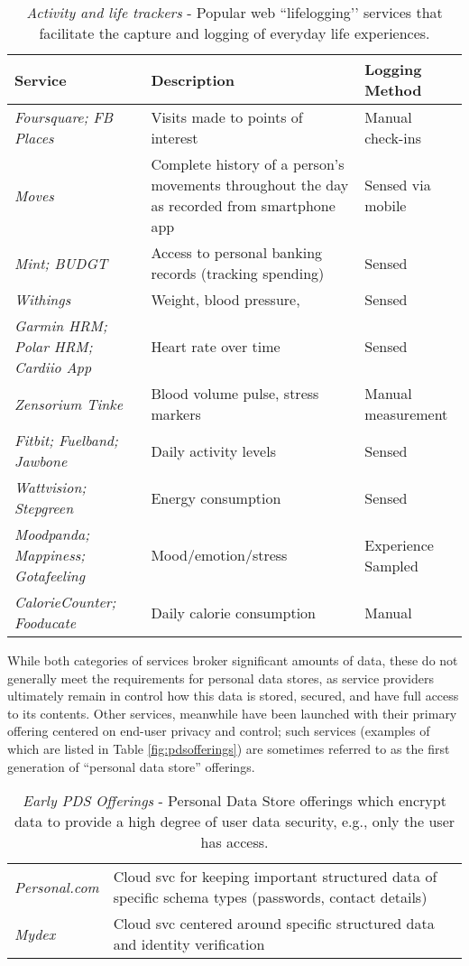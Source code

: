 \documentclass[graybox]{svmult}
\begin{document}
\begin{table}
\begin{tabular}{p{3cm} p{4.5cm} p{2.54cm}}
Service & Description & Logging Method \\
\hline
\emph{Foursquare; FB Places} & Visits made to points of interest & Manual check-ins \\
\emph{Moves} & Complete history of a person's movements throughout the day as recorded from smartphone app  & Sensed via mobile \\ 
\emph{Mint; BUDGT} & Access to personal banking records (tracking spending) & Sensed\\
\emph{Withings} & Weight, blood pressure,& Sensed \\
\emph{Garmin HRM; Polar HRM; Cardiio App} & Heart rate over time & Sensed \\
\emph{Zensorium Tinke} & Blood volume pulse, stress markers & Manual measurement \\
\emph{Fitbit; Fuelband; Jawbone} & Daily activity levels & Sensed \\ 
\emph{Wattvision; Stepgreen} & Energy consumption & Sensed \\
\emph{Moodpanda; Mappiness; Gotafeeling} & Mood/emotion/stress & Experience Sampled \\
\emph{CalorieCounter; Fooducate} & Daily calorie consumption & Manual \\
\end{tabular}
\caption{\emph{Activity and life trackers} - Popular web ``lifelogging’’ services that facilitate the capture and logging of everyday life experiences. }
\label{fig:aboutme}
\end{table}

While both categories of services broker significant amounts of data, these do not generally meet the requirements for personal data stores, as service providers ultimately remain in control how this data is stored, secured, and have full access to its contents.  Other services, meanwhile have been launched with their primary offering centered on end-user privacy and control; such services (examples of which are listed in Table \ref{fig:pdsofferings}) are sometimes referred to as the first generation of ``personal data store'' offerings.

\begin{table}
\begin{tabular}{l p{8.5cm}}
\emph{Personal.com} & Cloud svc for keeping important structured data of specific schema types (passwords, contact details)  \\
\emph{Mydex} & Cloud svc centered around specific structured data and identity verification  \\
\end{tabular}
\caption{\emph{Early PDS Offerings} - Personal Data Store offerings which encrypt data to provide a high degree of user data security, e.g., only the user has access.}
\label{fig:pdsofferingsp}
\end{table}
\end{document}
